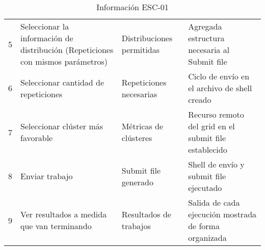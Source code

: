 \begin{table}[H]
\begin{tabular}{|p{2cm}|p{4cm}|p{2.5cm}|p{4.7cm}|}
		5                                       & Seleccionar la información de distribución (Repeticiones con mismos parámetros)     & Distribuciones permitidas       & Agregada estructura necesaria al Submit file                        \\
		6                                       & Seleccionar cantidad de repeticiones                                                & Repeticiones necesarias         & Ciclo de envío en el archivo de shell creado                        \\
		7                                       & Seleccionar clúster más favorable                                                   & Métricas de clústeres           & Recurso remoto del grid en el submit file establecido               \\
		8                                       & Enviar trabajo                                                                      & Submit file generado            & Shell de envío y submit file ejecutado                              \\
		9                                       & Ver resultados a medida que van terminando                                          & Resultados de trabajos          & Salida de cada ejecución mostrada de forma organizada               \\
		\hline
	\end{tabular}
	\caption{Información ESC-01}
	\label{table:esc-01}
\end{table}

